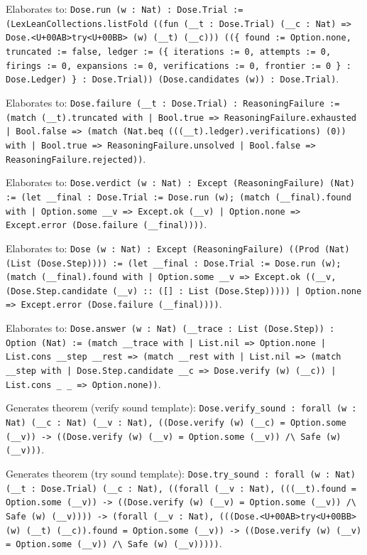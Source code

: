 \documentclass[11pt]{article}
\begin{document}
\noindent Elaborates to: \texttt{Dose.run (w : Nat) : Dose.Trial := (LexLeanCollections.listFold ((fun (\_\_t : Dose.Trial) (\_\_c : Nat) => Dose.<U+00AB>try<U+00BB> (w) (\_\_t) (\_\_c))) ((\{ found := Option.none, truncated := false, ledger := (\{ iterations := 0, attempts := 0, firings := 0, expansions := 0, verifications := 0, frontier := 0 \} : Dose.Ledger) \} : Dose.Trial)) (Dose.candidates (w)) : Dose.Trial)}.\par
\noindent Elaborates to: \texttt{Dose.failure (\_\_t : Dose.Trial) : ReasoningFailure := (match (\_\_t).truncated with | Bool.true => ReasoningFailure.exhausted | Bool.false => (match (Nat.beq (((\_\_t).ledger).verifications) (0)) with | Bool.true => ReasoningFailure.unsolved | Bool.false => ReasoningFailure.rejected))}.\par
\noindent Elaborates to: \texttt{Dose.verdict (w : Nat) : Except (ReasoningFailure) (Nat) := (let \_\_final : Dose.Trial := Dose.run (w); (match (\_\_final).found with | Option.some \_\_v => Except.ok (\_\_v) | Option.none => Except.error (Dose.failure (\_\_final))))}.\par
\noindent Elaborates to: \texttt{Dose (w : Nat) : Except (ReasoningFailure) ((Prod (Nat) (List (Dose.Step)))) := (let \_\_final : Dose.Trial := Dose.run (w); (match (\_\_final).found with | Option.some \_\_v => Except.ok ((\_\_v, (Dose.Step.candidate (\_\_v) :: ([] : List (Dose.Step))))) | Option.none => Except.error (Dose.failure (\_\_final))))}.\par
\noindent Elaborates to: \texttt{Dose.answer (w : Nat) (\_\_trace : List (Dose.Step)) : Option (Nat) := (match \_\_trace with | List.nil => Option.none | List.cons \_\_step \_\_rest => (match \_\_rest with | List.nil => (match \_\_step with | Dose.Step.candidate \_\_c => Dose.verify (w) (\_\_c)) | List.cons \_ \_ => Option.none))}.\par
\noindent Generates theorem (verify sound template): \texttt{Dose.verify\_sound : forall (w : Nat) (\_\_c : Nat) (\_\_v : Nat), ((Dose.verify (w) (\_\_c) = Option.some (\_\_v)) -> ((Dose.verify (w) (\_\_v) = Option.some (\_\_v)) /\textbackslash{} Safe (w) (\_\_v)))}.\par
\noindent Generates theorem (try sound template): \texttt{Dose.try\_sound : forall (w : Nat) (\_\_t : Dose.Trial) (\_\_c : Nat), ((forall (\_\_v : Nat), (((\_\_t).found = Option.some (\_\_v)) -> ((Dose.verify (w) (\_\_v) = Option.some (\_\_v)) /\textbackslash{} Safe (w) (\_\_v)))) -> (forall (\_\_v : Nat), (((Dose.<U+00AB>try<U+00BB> (w) (\_\_t) (\_\_c)).found = Option.some (\_\_v)) -> ((Dose.verify (w) (\_\_v) = Option.some (\_\_v)) /\textbackslash{} Safe (w) (\_\_v)))))}.\par
\end{document}
